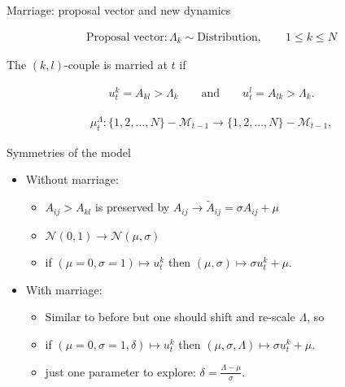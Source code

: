 \documentclass{beamer}
\begin{document}
\begin{frame}{Marriage: proposal vector and new dynamics}
    
\begin{align}
    \textrm{Proposal vector}: \Lambda_{k}\sim \textrm{Distribution},\qquad 1\leq k\leq N
\end{align}

    The $(k,l)$-couple is married at $t$ if

\begin{align}
     u^k_t=A_{kl}>\Lambda_k\qquad \textrm{and}\qquad u^l_t=A_{lk}>\Lambda_k.
    \label{marriedcoupled}
\end{align}


\begin{align}
    \mu_t^\Lambda:\{1,2,\dots,N\}-\mathcal{M}_{t-1}\rightarrow\{1,2,\dots,N\}-\mathcal{M}_{t-1},
    \label{marriedcouples}
\end{align}
\end{frame}


\begin{frame}{Symmetries of the model}
    \begin{itemize}
        \item Without marriage:
    \begin{itemize}
        \item $A_{ij}>A_{kl}$ is preserved by $A_{ij}\rightarrow\tilde{A}_{ij}=\sigma A_{ij}+\mu$
        \item $\mathcal{N}(0,1)\rightarrow \mathcal{N}(\mu,\sigma)$
        \item if $(\mu=0,\sigma=1)\mapsto u_t^k$ then $(\mu,\sigma)\mapsto \sigma u_t^k+\mu$.
    \end{itemize}
        \item With marriage:
        \begin{itemize}
            \item Similar to before but one should shift and re-scale $\Lambda$, so
            \item if $(\mu=0,\sigma=1,\delta)\mapsto u_t^k$ then $(\mu,\sigma,\Lambda)\mapsto \sigma u_t^k+\mu$.
            \item just one parameter to explore: $\delta=\frac{\Lambda-\mu}{\sigma}$.
        \end{itemize}
    \end{itemize}
\end{frame}
\end{document}
